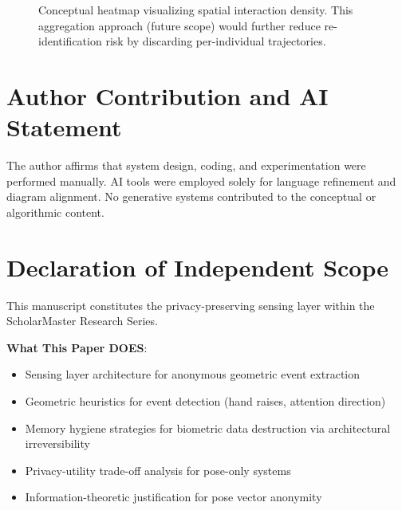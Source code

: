 \documentclass[conference]{IEEEtran}
\begin{document}
\begin{figure}[htbp]
\centering
{}

\caption{Conceptual heatmap visualizing spatial interaction density. This aggregation approach (future scope) would further reduce re-identification risk by discarding per-individual trajectories.}
\label{fig:heatmap}
\end{figure}

\section*{Author Contribution and AI Statement}
The author affirms that system design, coding, and experimentation were performed manually. AI tools were employed solely for language refinement and diagram alignment. No generative systems contributed to the conceptual or algorithmic content.

\section{Declaration of Independent Scope}
This manuscript constitutes the privacy-preserving sensing layer within the ScholarMaster Research Series.

\textbf{What This Paper DOES}:
\begin{itemize}
    \item Sensing layer architecture for anonymous geometric event extraction
    \item Geometric heuristics for event detection (hand raises, attention direction)
    \item Memory hygiene strategies for biometric data destruction via architectural irreversibility
    \item Privacy-utility trade-off analysis for pose-only systems
    \item Information-theoretic justification for pose vector anonymity
\end{itemize}
\end{document}
